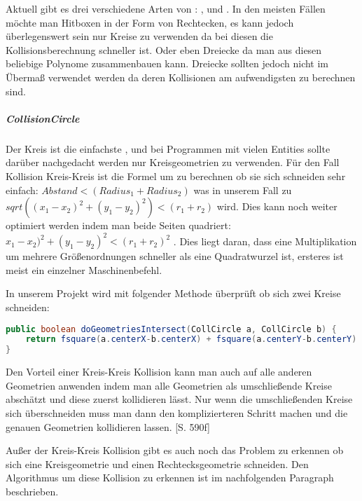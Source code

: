 Aktuell gibt es drei verschiedene Arten von : ,  und . In den meisten Fällen möchte man Hitboxen in der Form von Rechtecken, es kann jedoch überlegenswert sein nur Kreise zu verwenden da bei diesen die Kollisionsberechnung schneller ist. Oder eben Dreiecke da man aus diesen beliebige Polynome zusammenbauen kann. Dreiecke sollten jedoch nicht im Übermaß verwendet werden da deren Kollisionen am aufwendigsten zu berechnen sind.

\subparagraph{CollisionCircle}

Der Kreis ist die einfachste , und bei Programmen mit vielen Entities sollte darüber nachgedacht werden nur Kreisgeometrien zu verwenden.
Für den Fall Kollision Kreis-Kreis ist die Formel um zu berechnen ob sie sich schneiden sehr einfach:
$ Abstand < (Radius_1 + Radius_2) $ was in unserem Fall zu $ sqrt((x_1 - x_2)^2 + (y_1 - y_2)^2) < (r_1 + r_2)$ wird. Dies kann noch weiter optimiert werden indem man beide Seiten quadriert: $ x_1 - x_2)^2 + (y_1 - y_2)^2 < (r_1 + r_2)^2 $ \cite[S 499]{DGIJ}. Dies liegt daran, dass eine Multiplikation um mehrere Größenordnungen schneller als eine Quadratwurzel ist, ersteres ist meist ein einzelner Maschinenbefehl.

In unserem Projekt wird mit folgender Methode überprüft ob sich zwei Kreise schneiden:

\doinline
\begin{lstlisting}[caption=Erkennen von Kollisionen (Kreis-Kreis), title=\hspace{0 pt}, language=java]
public boolean doGeometriesIntersect(CollCircle a, CollCircle b) {
	return fsquare(a.centerX-b.centerX) + fsquare(a.centerY-b.centerY) < fsquare(a.radius + b.radius);
}
\end{lstlisting}

Den Vorteil einer Kreis-Kreis Kollision kann man auch auf alle anderen Geometrien anwenden indem man alle Geometrien als umschließende Kreise abschätzt und diese zuerst kollidieren lässt. Nur wenn die umschließenden Kreise sich überschneiden muss man dann den komplizierteren Schritt machen und die genauen Geometrien kollidieren lassen. \cite{EMFGAIA}[S. 590f]

Außer der Kreis-Kreis Kollision gibt es auch noch das Problem zu erkennen ob sich eine Kreisgeometrie und einen Rechtecksgeometrie schneiden.
Den Algorithmus um diese Kollision zu erkennen ist im nachfolgenden Paragraph  beschrieben.

